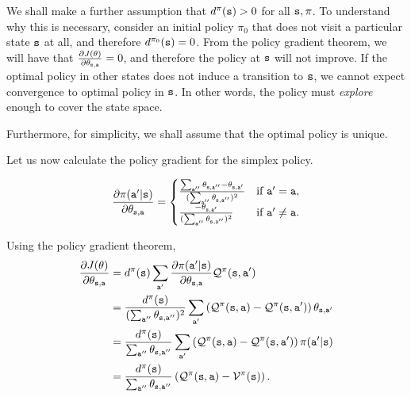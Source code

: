We shall make a further assumption that $d^{\pi}({\tt s}) > 0$ for all ${\tt s}, \pi$. To understand why this is necessary, consider an initial policy $\pi_0$ that does not visit a particular state ${\tt s}$ at all, and therefore $d^{\pi_0}({\tt s}) = 0$. From the policy gradient theorem, we will have that $\frac{\partial J(\theta)}{\partial \theta_{{\tt s},{\tt a}}} = 0$, and therefore the policy at ${\tt s}$ will not improve. If the optimal policy in other states does not induce a transition to ${\tt s}$, we cannot expect convergence to optimal policy in ${\tt s}$. In other words, the policy must \textit{explore} enough to cover the state space.

Furthermore, for simplicity, we shall assume that the optimal policy is unique.

Let us now calculate the policy gradient for the simplex policy.

\begin{equation*}
    \frac{\partial \pi({\tt a}'|{\tt s})}{\partial \theta_{{\tt s},{\tt a}}} = \begin{cases}
        \frac{\sum_{{\tt a}''} \theta_{{\tt s},{\tt a}''} - \theta_{{\tt s},{\tt a}'}}{(\sum_{{\tt a}''} \theta_{{\tt s},{\tt a}''})^2} & \text{if } {\tt a}' = {\tt a}, \\
\frac{ - \theta_{{\tt s},{\tt a}'}}{(\sum_{{\tt a}''} \theta_{{\tt s},{\tt a}''})^2} & \text{if } {\tt a}' \neq {\tt a}.
    \end{cases}
\end{equation*}

Using the policy gradient theorem,
\begin{equation*}
\begin{split}
    \frac{\partial J(\theta)}{\partial \theta_{{\tt s},{\tt a}}}  &= d^{\pi}({\tt s}) \sum_{{\tt a}'} \frac{\partial \pi({\tt a}'|{\tt s})}{\partial \theta_{{\tt s},{\tt a}}}\mathcal{Q}^{\pi}({\tt s},{\tt a}')\\
    &= \frac{d^{\pi}({\tt s})}{(\sum_{{\tt a}''} \theta_{{\tt s},{\tt a}''})^2} \sum_{{\tt a}'} \left(\mathcal{Q}^{\pi}({\tt s},{\tt a}) - \mathcal{Q}^{\pi}({\tt s},{\tt a}') \right)\theta_{{\tt s},{\tt a}'} \\
    &= \frac{d^{\pi}({\tt s})}{\sum_{{\tt a}''} \theta_{{\tt s},{\tt a}''}} \sum_{{\tt a}'} \left(\mathcal{Q}^{\pi}({\tt s},{\tt a}) - \mathcal{Q}^{\pi}({\tt s},{\tt a}') \right)\pi({\tt a}'|{\tt s}) \\
    &=\frac{d^{\pi}({\tt s})}{\sum_{{\tt a}''} \theta_{{\tt s},{\tt a}''}}\left(\mathcal{Q}^{\pi}({\tt s},{\tt a}) - \mathcal{V}^{\pi}({\tt s}) \right).
\end{split}  
\end{equation*}

